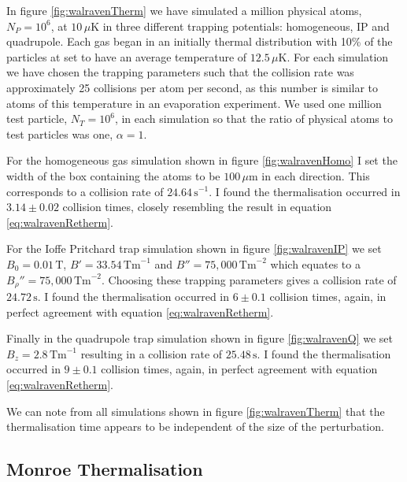 In figure \ref{fig:walravenTherm} we have simulated a million physical atoms, $N_P=10^6$, at $10\,\mu \mathrm{K}$ in three different trapping potentials: homogeneous, IP and quadrupole. 
Each gas began in an initially thermal distribution with 10\% of the particles at set to have an average temperature of $12.5\,\mu\mathrm{K}$.
For each simulation we have chosen the trapping parameters such that the collision rate was approximately 25 collisions per atom per second, as this number is similar to atoms of this temperature in an evaporation experiment.
We used one million test particle, $N_T=10^6$, in each simulation so that the ratio of physical atoms to test particles was one, $\alpha=1$.

For the homogeneous gas simulation shown in figure \ref{fig:walravenHomo} I set the width of the box containing the atoms to be $100\,\mu \mathrm{m}$ in each direction. 
This corresponds to a collision rate of $24.64\,\mathrm{s}^{-1}$.
I found the thermalisation occurred in $3.14\pm 0.02$ collision times, closely resembling the result in equation \eqref{eq:walravenRetherm}.

For the Ioffe Pritchard trap simulation shown in figure \ref{fig:walravenIP} we set $B_0=0.01\,\mathrm{T}$, $B'=33.54\,\mathrm{Tm}^{-1}$ and $B''=75,000\,\mathrm{Tm}^{-2}$ which equates to a ${B_{\rho}}''=75,000\,\mathrm{Tm}^{-2}$. 
Choosing these trapping parameters gives a collision rate of $24.72\,\mathrm{s}$.
I found the thermalisation occurred in $6\pm 0.1$ collision times, again, in perfect agreement with equation \eqref{eq:walravenRetherm}.

Finally in the quadrupole trap simulation shown in figure \ref{fig:walravenQ} we set $B_z=2.8\,\mathrm{Tm}^{-1}$ resulting in a collision rate of $25.48\,\mathrm{s}$.
I found the thermalisation occurred in $9\pm 0.1$ collision times, again, in perfect agreement with equation \eqref{eq:walravenRetherm}.

We can note from all simulations shown in figure \ref{fig:walravenTherm} that the thermalisation time appears to be independent of the size of the perturbation.

\subsection{Monroe Thermalisation}

